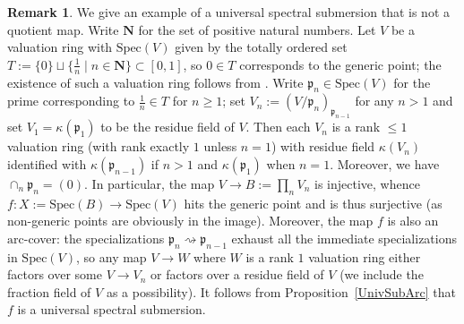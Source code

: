 \documentclass[reqno]{amsart}
\newcommand{\arc}{\mathrm{arc}}
\theoremstyle{definition}
\newtheorem{remark}[theorem]{Remark}
\begin{document}
\begin{remark}
\label{LargeExample}
We give an example of a universal spectral submersion that is not a quotient
map. 
Write $\mathbf{N}$ for the set of positive natural numbers. Let $V$ be a
valuation ring with $\mathrm{Spec}(V)$ given by the totally ordered set $T :=
\{0\} \sqcup \{\frac{1}{n} \mid n \in \mathbf{N}\} \subset [0,1]$, so $0 \in T$
corresponds to the generic point; the existence of such a valuation ring
follows from \cite[Theorem 3.9 (b), (e)]{SarussiToset}. Write $\mathfrak{p}_n
\in \mathrm{Spec}(V)$ for the prime corresponding to $\frac{1}{n} \in T$ for $n
\geq 1$; set $V_n := (V/\mathfrak{p}_n)_{\mathfrak{p}_{n-1}}$ for any $n > 1$
and set $V_1 = \kappa(\mathfrak{p}_1)$ to be the residue field of $V$. Then
each $V_n$ is a rank $\leq 1$ valuation ring (with rank exactly $1$ unless $n =
1$) with residue field $\kappa(V_n)$ identified with
$\kappa(\mathfrak{p}_{n-1})$ if $n > 1$ and $\kappa(\mathfrak{p}_1)$ when
$n=1$. Moreover, we have $\cap_n \mathfrak{p}_n = (0)$. In particular, the map
$V \to B := \prod_{n} V_n$ is injective, whence $f\colon  X:=\mathrm{Spec}(B)
\to \mathrm{Spec}(V)$ hits the generic point and is thus surjective (as
non-generic points are obviously in the image). Moreover, the map $f$ is also
an $\arc$-cover: the specializations $\mathfrak{p}_n \rightsquigarrow
\mathfrak{p}_{n-1}$ exhaust all the immediate specializations in
$\mathrm{Spec}(V)$, so any map $V \to W$ where $W$ is a rank $1$ valuation ring
either factors over some $V \to V_n$ or factors over a residue field of $V$
(we include the fraction field of $V$ as a possibility). It follows from Proposition~\ref{UnivSubArc} that $f$ is a universal spectral submersion. 


\end{remark}
\end{document}
